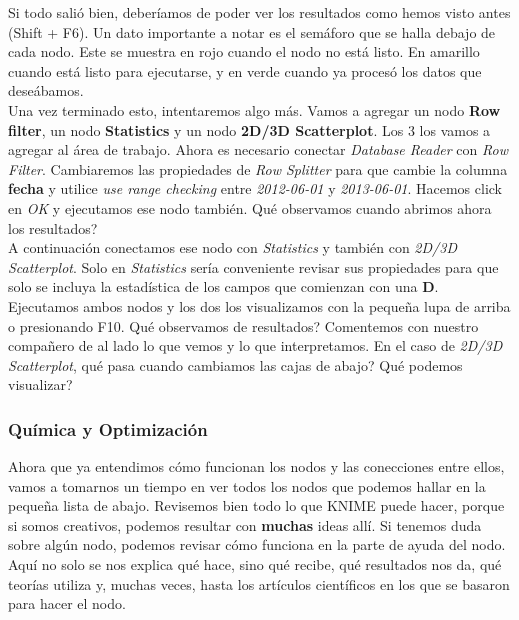 \documentclass[10pt,letterpaper]{article}
\begin{document}
Si todo sali\'o bien, deber\'iamos de poder ver los resultados como hemos visto antes (Shift + F6). Un dato importante a notar es el sem\'aforo que se halla debajo de cada nodo. Este se muestra en rojo cuando el nodo no est\'a listo. En amarillo cuando est\'a listo para ejecutarse, y en verde cuando ya proces\'o los datos que dese\'abamos.\\

Una vez terminado esto, intentaremos algo m\'as. Vamos a agregar un nodo \textbf{Row filter}, un nodo \textbf{Statistics} y un nodo \textbf{2D/3D Scatterplot}. Los 3 los vamos a agregar al \'area de trabajo. Ahora es necesario conectar \emph{Database Reader} con \emph{Row Filter}. Cambiaremos las propiedades de \emph{Row Splitter} para que cambie la columna \textbf{fecha} y utilice \emph{use range checking} entre \emph{2012-06-01} y \emph{2013-06-01}. Hacemos click en \emph{OK} y ejecutamos ese nodo tambi\'en. Qu\'e observamos cuando abrimos ahora los resultados?\\

A continuaci\'on conectamos ese nodo con \emph{Statistics} y tambi\'en con \emph{2D/3D Scatterplot}. Solo en \emph{Statistics} ser\'ia conveniente revisar sus propiedades para que solo se incluya la estad\'istica de los campos que comienzan con una \textbf{D}. Ejecutamos ambos nodos y los dos los visualizamos con la peque\~na lupa de arriba o presionando F10. Qu\'e observamos de resultados? Comentemos con nuestro compa\~nero de al lado lo que vemos y lo que interpretamos. En el caso de \emph{2D/3D Scatterplot}, qu\'e pasa cuando cambiamos las cajas de abajo? Qu\'e podemos visualizar?

\subsubsection{Qu\'imica y Optimizaci\'on}
Ahora que ya entendimos c\'omo funcionan los nodos y las conecciones entre ellos, vamos a tomarnos un tiempo en ver todos los nodos que podemos hallar en la peque\~na lista de abajo. Revisemos bien todo lo que KNIME puede hacer, porque si somos creativos, podemos resultar con \textbf{muchas} ideas all\'i. Si tenemos duda sobre alg\'un nodo, podemos revisar c\'omo funciona en la parte de ayuda del nodo. Aqu\'i no solo se nos explica qu\'e hace, sino qu\'e recibe, qu\'e resultados nos da, qu\'e teor\'ias utiliza y, muchas veces, hasta los art\'iculos cient\'ificos en los que se basaron para hacer el nodo.\\
\end{document}
